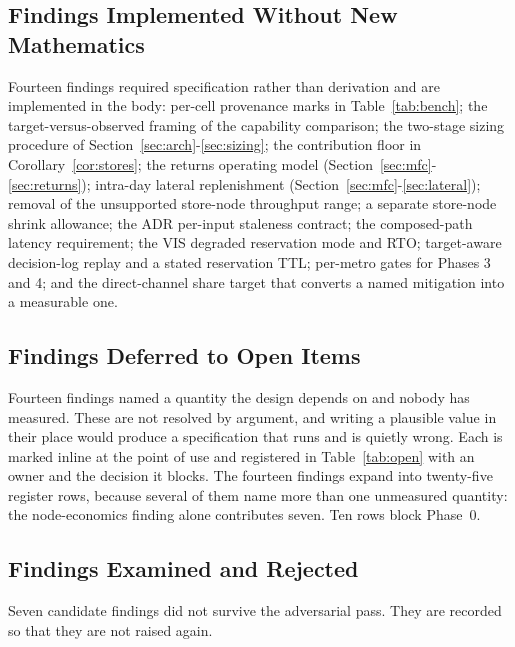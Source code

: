 \documentclass[10pt,twocolumn,letterpaper]{article}
\theoremstyle{definition}
\begin{document}
\subsection{Findings Implemented Without New Mathematics}

Fourteen findings required specification rather than derivation and are implemented in the body: per-cell provenance marks in Table~\ref{tab:bench}; the target-versus-observed framing of the capability comparison; the two-stage sizing procedure of Section~\ref{sec:arch}-\ref{sec:sizing}; the contribution floor in Corollary~\ref{cor:stores}; the returns operating model (Section~\ref{sec:mfc}-\ref{sec:returns}); intra-day lateral replenishment (Section~\ref{sec:mfc}-\ref{sec:lateral}); removal of the unsupported store-node throughput range; a separate store-node shrink allowance; the ADR per-input staleness contract; the composed-path latency requirement; the VIS degraded reservation mode and RTO; target-aware decision-log replay and a stated reservation TTL; per-metro gates for Phases 3 and 4; and the direct-channel share target that converts a named mitigation into a measurable one.

\subsection{Findings Deferred to Open Items}

Fourteen findings named a quantity the design depends on and nobody has measured. These are not resolved by argument, and writing a plausible value in their place would produce a specification that runs and is quietly wrong. Each is marked inline at the point of use and registered in Table~\ref{tab:open} with an owner and the decision it blocks. The fourteen findings expand into twenty-five register rows, because several of them name more than one unmeasured quantity: the node-economics finding alone contributes seven. Ten rows block Phase~0.

\subsection{Findings Examined and Rejected}

Seven candidate findings did not survive the adversarial pass. They are recorded so that they are not raised again.
\end{document}
